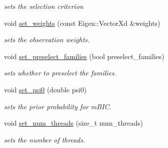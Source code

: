 \begin{DoxyCompactItemize}
\begin{DoxyCompactList}\small\item\em sets the selection criterion \end{DoxyCompactList}\item 
\mbox{\label{classvinecopulib_1_1_fit_controls_bicop_abe41e1cf7edfbd0a4dd9031c7a75ea14}} 
void \hyperlink{classvinecopulib_1_1_fit_controls_bicop_abe41e1cf7edfbd0a4dd9031c7a75ea14}{set\+\_\+weights} (const Eigen\+::\+Vector\+Xd \&weights)
\begin{DoxyCompactList}\small\item\em sets the observation weights. \end{DoxyCompactList}\item 
\mbox{\label{classvinecopulib_1_1_fit_controls_bicop_a7850b5ba8acaf78109d00789d93cc876}} 
void \hyperlink{classvinecopulib_1_1_fit_controls_bicop_a7850b5ba8acaf78109d00789d93cc876}{set\+\_\+preselect\+\_\+families} (bool preselect\+\_\+families)
\begin{DoxyCompactList}\small\item\em sets whether to preselect the families. \end{DoxyCompactList}\item 
\mbox{\label{classvinecopulib_1_1_fit_controls_bicop_a3421f63a8ec0eed23c7392d16770658e}} 
void \hyperlink{classvinecopulib_1_1_fit_controls_bicop_a3421f63a8ec0eed23c7392d16770658e}{set\+\_\+psi0} (double psi0)
\begin{DoxyCompactList}\small\item\em sets the prior probability for m\+B\+IC. \end{DoxyCompactList}\item 
\mbox{\label{classvinecopulib_1_1_fit_controls_bicop_adc395c1123ad4d9ad9cc795d9c34c9a8}} 
void \hyperlink{classvinecopulib_1_1_fit_controls_bicop_adc395c1123ad4d9ad9cc795d9c34c9a8}{set\+\_\+num\+\_\+threads} (size\+\_\+t num\+\_\+threads)
\begin{DoxyCompactList}\small\item\em sets the number of threads. \end{DoxyCompactList}\end{DoxyCompactItemize}


